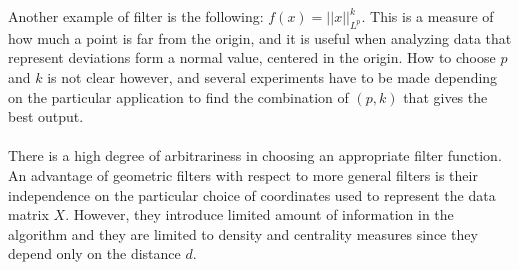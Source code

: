 Another example of filter is the following: $f(x)=||x||_{L^p}^k$\cite{PAD}. This is a measure of how much a point is far from the origin, and it is useful when analyzing data that represent deviations form a normal value, centered in the origin. How to choose $p$ and $k$ is not clear however, and several experiments have to be made depending on the particular application to find the combination of $(p,k)$ that gives the best output.
\paragraph{} There is a high degree of arbitrariness in choosing an appropriate filter function. An advantage of geometric filters with respect to more general filters is their independence on the particular choice of coordinates used to represent the data matrix $X$. However, they introduce limited amount of information in the algorithm and they are limited to density and centrality measures since they depend only on the distance $d$.
